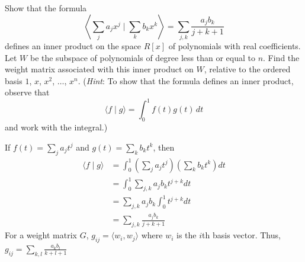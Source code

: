 \documentclass[11pt]{article}
\begin{document}
\begin{homeworkProblem}

    Show that the formula
    \[
        \left\langle\sum_j a_j x^j \mid \sum_k b_k x^k\right\rangle=\sum_{j, k} \frac{a_j b_k}{j+k+1}
    \]
    defines an inner product on the space $R[x]$ of polynomials with real coefficients. Let $W$ be the
    subspace of polynomials of degree less than or equal to $n$. Find the weight matrix associated
    with this inner product on $W$, relative to the ordered basis $1$, $x$, $x^2$, $\dots$, $x^n$.
    (\textit{Hint}: To show that the formula defines an inner product, observe that
    \[
        \langle f \mid g \rangle = \int_{0}^{1} f(t) g(t) \, dt
    \]
    and work with the integral.) \\

    \solution

    If \(f(t) = \sum_{j} a_j t^j\) and \(g(t) = \sum_{k} b_k t^k\), then
    \begin{align*}
        \langle f \mid g \rangle & = \int_{0}^{1} \left( \sum_{j} a_j t^j \right) \left( \sum_{k} b_k t^k \right) dt \\
                                 & = \int_{0}^{1} \sum_{j, k} a_j b_k t^{j+k} dt                                     \\
                                 & = \sum_{j, k} a_j b_k \int_{0}^{1} t^{j+k} dt                                     \\
                                 & = \sum_{j, k} \frac{a_j b_k}{j+k+1}
    \end{align*}
    For a weight matrix $G$, $g_{ij}= \langle w_i, w_j \rangle$ where $w_i$ is the $i$th basis vector.
    Thus, $g_{ij} = \sum_{k, l} \frac{a_k b_l}{k+l+1}$
\end{homeworkProblem}

\pagebreak
\end{document}
